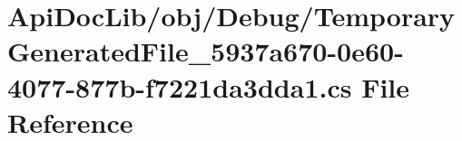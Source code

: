\hypertarget{_api_doc_lib_2obj_2_debug_2_temporary_generated_file__5937a670-0e60-4077-877b-f7221da3dda1_8cs}{\section{Api\+Doc\+Lib/obj/\+Debug/\+Temporary\+Generated\+File\+\_\+5937a670-\/0e60-\/4077-\/877b-\/f7221da3dda1.cs File Reference}
\label{_api_doc_lib_2obj_2_debug_2_temporary_generated_file__5937a670-0e60-4077-877b-f7221da3dda1_8cs}
}
